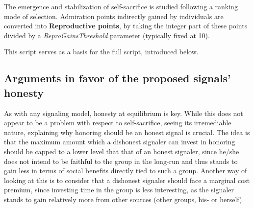 \documentclass[a4paper,12pt]{report}
\begin{document}
The emergence and stabilization of self-sacrifice is studied following a
ranking mode of selection.
Admiration points indirectly gained by individuals are converted
into \textbf{Reproductive points}, by taking the integer part of these
points divided by a \emph{ReproGainsThreshold} parameter (typically fixed at 10).

This script serves as a basis for the full script, introduced below.





\subsection{Arguments in favor of the proposed signals’ honesty}
\label{s:honesty}
As with any signaling model, honesty at equilibrium is key.
While this does not appear to be a problem with respect to self-sacrifice,
seeing its irremediable nature, explaining why honoring should be an honest
signal is crucial. The idea is that the maximum amount which a dishonest
signaler can invest in honoring should be capped to a lower level that that
of an honest signaler, since he/she does not intend to be faithful to the
group in the long-run and thus stands to gain less in terms of social benefits
directly tied to such a group. Another way of looking at this is to consider
that a dishonest signaler should face a marginal cost premium, since investing
time in the group is less interesting, as the signaler stands to gain relatively
more from other sources (other groups, his- or herself).
\end{document}
